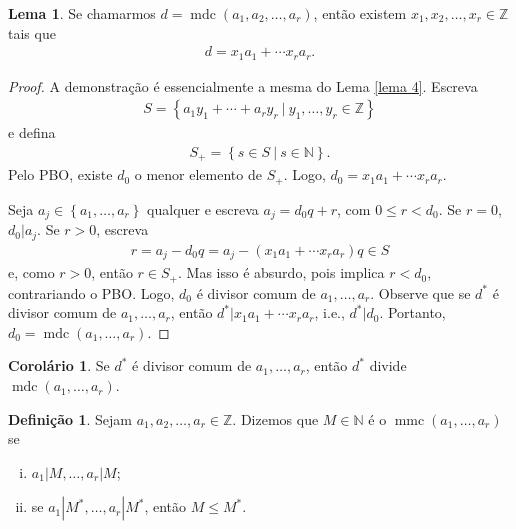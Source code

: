 \documentclass[a4paper,11pt,twoside, leqno]{article}
\DeclareMathOperator{\mdc}{mdc}
\DeclareMathOperator{\mmc}{mmc}
\theoremstyle{definition}
\newtheorem*{definition}{Definição}
\newtheorem{corollary}{Corolário}[theorem]
\newtheorem{lemma}[theorem]{Lema}
\begin{document}
\begin{lemma}
	\label{lema 58}
	Se chamarmos $d = \mdc(a_1, a_2, \dots, a_r)$, então existem $x_1, x_2, \dots, x_r\in\mathbb{Z}$ tais que 
	\begin{align*}
	d = x_1a_1 + \cdots x_ra_r.
	\end{align*}
\end{lemma}
\begin{proof}
	A demonstração é essencialmente a mesma do Lema \eqref{lema 4}. Escreva
	\begin{align*}
	S = \left\{ a_1y_1 + \cdots + a_ry_r \ | \ y_1, \dots, y_r\in\mathbb{Z} \right\}
	\end{align*}
	e defina
	\begin{align*}
	S_+ = \left\{ s\in S \ | \ s\in\mathbb{N} \right\}.
	\end{align*}
	Pelo PBO, existe $d_0$ o menor elemento de $S_+$. Logo, $d_0 = x_1a_1 + \cdots x_ra_r$.
	\par\vspace{0.3cm} Seja $a_j\in\left\{ a_1, \dots, a_r \right\}$ qualquer e escreva $a_j = d_0q+r$, com $0\leq r < d_0$. Se $r = 0$, $d_0|a_j$. Se $r>0$, escreva
	\begin{align*}
	r = a_j - d_0q = a_j - (x_1a_1 + \cdots x_ra_r)q\in S
	\end{align*}
	e, como $r>0$, então $r\in S_+$. Mas isso é absurdo, pois implica $r < d_0$, contrariando o PBO. Logo, $d_0$ é divisor comum de $a_1, \dots, a_r$. Observe que se $d^\ast$ é divisor comum de $a_1, \dots, a_r$, então $d^\ast|x_1a_1 + \cdots x_ra_r$, i.e., $d^\ast|d_0$. Portanto, $d_0 = \mdc(a_1, \dots, a_r).$
\end{proof}
\begin{corollary}
	Se $d^\ast$ é divisor comum de $a_1, \dots, a_r$, então $d^\ast$ divide $\mdc(a_1, \dots, a_r).$
\end{corollary}
\begin{definition}
	\label{def mmc geral}
	Sejam $a_1, a_2, \dots, a_r\in\mathbb{Z}$. Dizemos que $M\in\mathbb{N}$ é o $\mmc(a_1, \dots, a_r)$ se 
	\begin{enumerate}[(i)]
		\item $a_1|M, \dots, a_r|M$;
		\item se $a_1|M^\ast, \dots, a_r|M^\ast$, então $M\leq M^\ast$.
	\end{enumerate} 
\end{definition}
\end{document}
